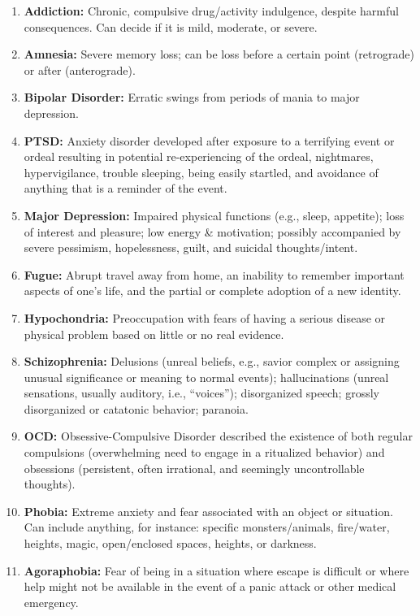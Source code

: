 \documentclass[12pt]{book}  %
\begin{document}
\begin{enumerate}
    \item \textbf{Addiction:} Chronic, compulsive drug/activity indulgence, despite harmful consequences. Can decide if it is mild, moderate, or severe.
    \item \textbf{Amnesia:} Severe memory loss; can be loss before a certain point (retrograde) or after (anterograde).
    \item \textbf{Bipolar Disorder:} Erratic swings from periods of mania to major depression.
    \item \textbf{PTSD:} Anxiety disorder developed after exposure to a terrifying event or ordeal resulting in potential re-experiencing of the ordeal, nightmares, hypervigilance, trouble sleeping, being easily startled, and avoidance of anything that is a reminder of the event.
    \item \textbf{Major Depression:} Impaired physical functions (e.g., sleep, appetite); loss of interest and pleasure; low energy \& motivation; possibly accompanied by severe pessimism, hopelessness, guilt, and suicidal thoughts/intent.
    \item \textbf{Fugue:} Abrupt travel away from home, an inability to remember important aspects of one’s life, and the partial or complete adoption of a new identity.
    \item \textbf{Hypochondria:} Preoccupation with fears of having a serious disease or physical problem based on little or no real evidence.
    \item \textbf{Schizophrenia:} Delusions (unreal beliefs, e.g., savior complex or assigning unusual significance or meaning to normal events); hallucinations (unreal sensations, usually auditory, i.e., “voices”); disorganized speech; grossly disorganized or catatonic behavior; paranoia.
    \item \textbf{OCD:} Obsessive-Compulsive Disorder described the existence of both regular compulsions (overwhelming need to engage in a ritualized behavior) and obsessions (persistent, often irrational, and seemingly uncontrollable thoughts).
    \item \textbf{Phobia:} Extreme anxiety and fear associated with an object or situation. Can include anything, for instance: specific monsters/animals, fire/water, heights, magic, open/enclosed spaces, heights, or darkness.
    \item \textbf{Agoraphobia:} Fear of being in a situation where escape is difficult or where help might not be available in the event of a panic attack or other medical emergency.

\end{enumerate}
\end{document}

